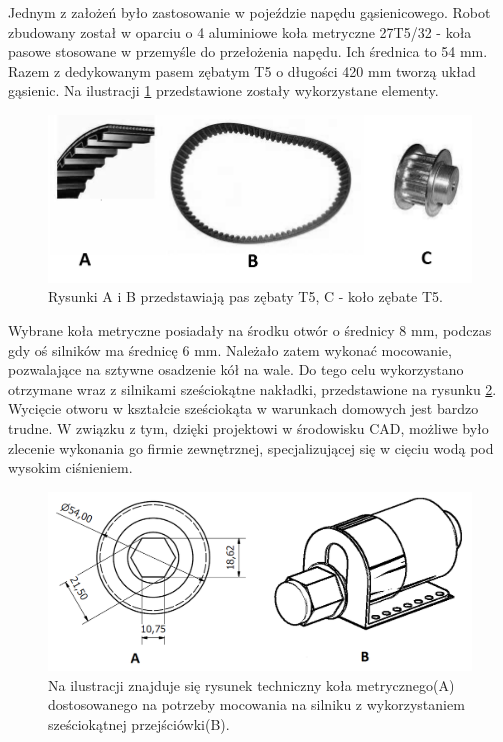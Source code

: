 Jednym z założeń było zastosowanie w pojeździe napędu gąsienicowego. Robot zbudowany został w oparciu o 4 aluminiowe koła metryczne 27T5/32 - koła pasowe stosowane w przemyśle do przełożenia napędu. Ich średnica to 54 mm. Razem z dedykowanym pasem zębatym T5 o długości 420 mm tworzą układ gąsienic. Na ilustracji \ref{gasienice_elementy} przedstawione zostały wykorzystane elementy.

  \begin{figure}[H]
    \begin{center}
      \includegraphics[scale=0.5]{imgs/gasienice.png}
 	\caption[Elementy gąsienic.]{\small{Rysunki A i B przedstawiają pas zębaty T5, C - koło zębate T5. }\footnotemark}
	\label{gasienice_elementy}
    \end{center}
  \end{figure}

Wybrane koła metryczne posiadały na środku otwór o średnicy 8 mm, podczas gdy oś silników ma średnicę 6 mm. Należało zatem wykonać mocowanie, pozwalające na sztywne osadzenie kół na wale. Do tego celu wykorzystano otrzymane wraz z silnikami sześciokątne nakładki, przedstawione na rysunku \ref{zamocowanie_szesciokatne}. Wycięcie otworu w kształcie sześciokąta w warunkach domowych jest bardzo trudne. W związku z tym, dzięki projektowi w środowisku CAD, możliwe było zlecenie wykonania go firmie zewnętrznej, specjalizującej się w cięciu wodą pod wysokim ciśnieniem.
\newpage
  \begin{figure}[H]
    \begin{center}
      \includegraphics[scale=0.40]{imgs/moc_kol_tyl.png}
 	\caption[Model tylnych kół.]{\small{Na ilustracji znajduje się rysunek techniczny koła metrycznego(A) dostosowanego na potrzeby mocowania na silniku z wykorzystaniem sześciokątnej przejściówki(B).}}
	\label{zamocowanie_szesciokatne}
    \end{center}
  \end{figure}

